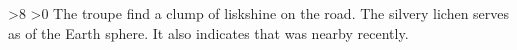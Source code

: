 
\ifnum\value{r12}>8
  \ifnum\value{temperature}>0
    The troupe find a clump of liskshine on the road.
    The silvery lichen serves as  of the Earth \gls{sphere}.
    It also indicates that  was nearby recently.
  \fi
\fi

